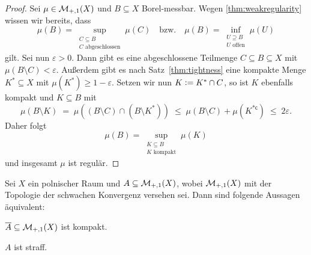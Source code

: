 \documentclass[../main/main.tex]{subfiles}
\begin{document}
	\begin{proof}
		Sei $\mu \in \mathcal{M}_{+,1}(X)$ und $B \subseteq X$ Borel-messbar. 
		Wegen \ref{thm:weakregularity} wissen wir bereits, dass 
		\[\mu(B) = \sup_{\substack{C \subseteq B \\ C \text{ abgeschlossen}}} \mu(C) 
		\quad \text{bzw.} \quad \mu(B) = \inf_{\substack{U \supseteq B \\ U \text{ offen}}} 
		\mu(U)\]
		gilt. Sei nun $\varepsilon > 0$. Dann gibt es eine abgeschlossene Teilmenge 
		$C \subseteq B \subseteq X$ mit $\mu(B \setminus C) < \varepsilon$. 
		Außerdem gibt es nach Satz~\ref{thm:tightness} eine kompakte Menge 
		$K^\ast \subseteq X$ mit $\mu(K^\ast) \geq 1 - \varepsilon$. Setzen 
		wir nun $K \vcentcolon = K^\ast \cap C$, so ist $K$ ebenfalls kompakt und 
		$K \subseteq B$ mit 
		\[ \mu(B \setminus K) 
		\; = \; \mu((B \setminus C) \cap (B \setminus K^\ast)) 
		\; \leq \; \mu(B \setminus C) + \mu(K^{\ast \mathsf{c}}) 
		\; \leq \; 2 \varepsilon \text{.} \]
		Daher folgt 
		\[\mu(B) 
		= \sup_{\substack{K \subseteq B \\ K \text{ kompakt}}} \mu(K)\] 
		und insgesamt $\mu$ ist regulär.
	\end{proof}

	\begin{Satz}[Prokhorov]
		Sei $X$ ein polnischer Raum und $A \subseteq \mathcal{M}_{+,1}(X)$, wobei $\mathcal{M}_{+,1}(X)$ mit der Topologie der schwachen Konvergenz versehen sei. Dann sind folgende Aussagen äquivalent:
		\begin{equivalentthm}
			\item $\overline{A} \subseteq \mathcal{M}_{+,1}(X)$ ist kompakt.
			\item $A$ ist straff.
		\end{equivalentthm}
	\end{Satz}
	
\end{document}
